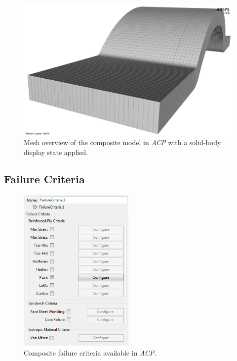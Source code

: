 \begin{figure}[htp]
\centering
\includegraphics[width=1\textwidth]{./figures/fea/fea-acp-solidmodel-closeup}
\caption{Mesh overview of the composite model in \textit{ACP} with a solid-body display state applied.}
\label{fig:fea-acp-solidmodel-closeup}
\end{figure}

\clearpage

\subsection{Failure Criteria}

\begin{figure}[htp]
\centering
\includegraphics[width=0.5\textwidth]{./figures/fea/fea-acp-failure-criteria-definition}
\caption{Composite failure criteria available in \textit{ACP}.}
\label{fig:fea-acp-failure-criteria-definition}
\end{figure}


